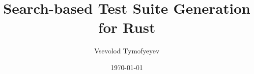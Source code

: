 \documentclass{article}
\begin{document}
\title{Search-based Test Suite Generation for Rust}
\author{Vsevolod Tymofyeyev}
\date{\today}
\maketitle

\tableofcontents
\newpage

\end{document}
